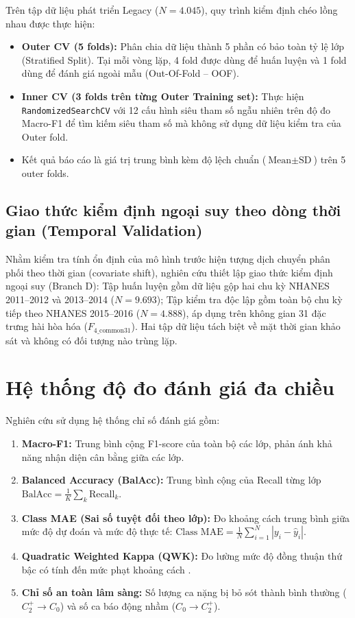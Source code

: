 Trên tập dữ liệu phát triển Legacy ($N = 4.045$), quy trình kiểm định chéo lồng nhau được thực hiện:
\begin{itemize}
    \item \textbf{Outer CV (5 folds):} Phân chia dữ liệu thành 5 phần có bảo toàn tỷ lệ lớp (Stratified Split). Tại mỗi vòng lặp, 4 fold được dùng để huấn luyện và 1 fold dùng để đánh giá ngoài mẫu (Out-Of-Fold -- OOF).
    \item \textbf{Inner CV (3 folds trên từng Outer Training set):} Thực hiện \texttt{RandomizedSearchCV} với 12 cấu hình siêu tham số ngẫu nhiên trên độ đo Macro-F1 để tìm kiếm siêu tham số mà không sử dụng dữ liệu kiểm tra của Outer fold.
    \item Kết quả báo cáo là giá trị trung bình kèm độ lệch chuẩn ($\text{Mean} \pm \text{SD}$) trên 5 outer folds.
\end{itemize}

\subsection{Giao thức kiểm định ngoại suy theo dòng thời gian (Temporal Validation)}
\label{subsec:temporal-protocol}

Nhằm kiểm tra tính ổn định của mô hình trước hiện tượng dịch chuyển phân phối theo thời gian (covariate shift), nghiên cứu thiết lập giao thức kiểm định ngoại suy (Branch D): Tập huấn luyện gồm dữ liệu gộp hai chu kỳ NHANES 2011--2012 và 2013--2014 ($N = 9.693$); Tập kiểm tra độc lập gồm toàn bộ chu kỳ tiếp theo NHANES 2015--2016 ($N = 4.888$), áp dụng trên không gian 31 đặc trưng hài hòa hóa ($F_{4\_\text{common31}}$). Hai tập dữ liệu tách biệt về mặt thời gian khảo sát và không có đối tượng nào trùng lặp.

\section{Hệ thống độ đo đánh giá đa chiều}
\label{sec:he-thong-do-do}

Nghiên cứu sử dụng hệ thống chỉ số đánh giá gồm:
\begin{enumerate}
    \item \textbf{Macro-F1:} Trung bình cộng F1-score của toàn bộ các lớp, phản ánh khả năng nhận diện cân bằng giữa các lớp.
    \item \textbf{Balanced Accuracy (BalAcc):} Trung bình cộng của Recall từng lớp $\text{BalAcc} = \frac{1}{K}\sum_k \text{Recall}_k$.
    \item \textbf{Class MAE (Sai số tuyệt đối theo lớp):} Đo khoảng cách trung bình giữa mức độ dự đoán và mức độ thực tế: $\text{Class MAE} = \frac{1}{N} \sum_{i=1}^N |y_i - \hat{y}_i|$.
    \item \textbf{Quadratic Weighted Kappa (QWK):} Đo lường mức độ đồng thuận thứ bậc có tính đến mức phạt khoảng cách \cite{cohen1968weighted}.
    \item \textbf{Chỉ số an toàn lâm sàng:} Số lượng ca nặng bị bỏ sót thành bình thường ($C_2^+ \to C_0$) và số ca báo động nhầm ($C_0 \to C_2^+$).
\end{enumerate}

